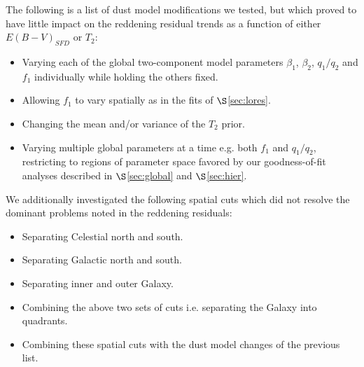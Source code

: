\documentclass{emulateapj}
\begin{document}
The following is a list of dust model modifications we tested, but which
proved to have little impact on the reddening residual trends as a function 
of either $E(B-V)_{SFD}$ or $T_2$:

\begin{itemize}
\item Varying each of the global two-component model parameters $\beta_1$, 
$\beta_2$, $q_1/q_2$ and $f_1$ individually while holding the others fixed.
\vspace{-3mm}
\item Allowing $f_1$ to vary spatially as in the fits of $\S$\ref{sec:lores}.
\vspace{-2mm}
\item Changing the mean and/or variance of the $T_2$ prior.
\vspace{-6mm}
\item Varying multiple global parameters at a time e.g. both $f_1$ and 
$q_1/q_2$, restricting to regions of parameter space favored by our 
goodness-of-fit analyses described in $\S$\ref{sec:global} and 
$\S$\ref{sec:hier}.
\end{itemize}

We additionally investigated the following spatial cuts which did not resolve 
the dominant problems noted in the reddening residuals:
\begin{itemize}
\item Separating Celestial north and south.
\vspace{-3mm}
\item Separating Galactic north and south.
\vspace{-3mm}
\item Separating inner and outer Galaxy.
\vspace{-3mm}
\item Combining the above two sets of cuts i.e. separating the Galaxy into
quadrants. 
\vspace{-3mm}
\item Combining these spatial cuts with the dust model changes of the previous
list.
\end{itemize}
\end{document}
